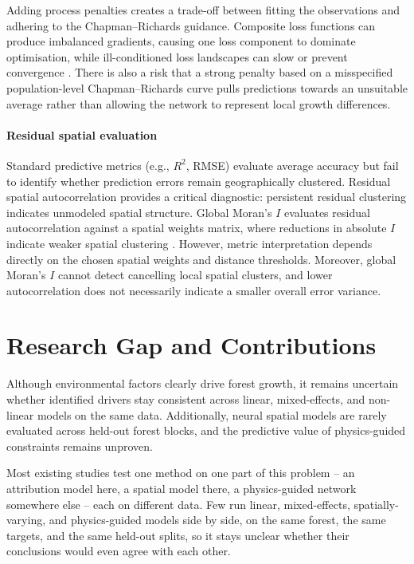 Adding process penalties creates a trade-off between fitting the observations and adhering to the Chapman--Richards guidance. Composite loss functions can produce imbalanced gradients, causing one loss component to dominate optimisation, while ill-conditioned loss landscapes can slow or prevent convergence \cite{wang2021Understanding_C4_NN}. %
There is also a risk that a strong penalty based on a misspecified population-level Chapman--Richards curve pulls predictions towards an unsuitable average rather than allowing the network to represent local growth differences.

\paragraph*{Residual spatial evaluation}
Standard predictive metrics (e.g., $R^2$, RMSE) evaluate average accuracy but fail to identify whether prediction errors remain geographically clustered. Residual spatial autocorrelation provides a critical diagnostic: persistent residual clustering indicates unmodeled spatial structure. Global Moran's $I$ evaluates residual autocorrelation against a spatial weights matrix, where reductions in absolute $I$ indicate weaker spatial clustering \cite{moran1950Notes_c5_eval, kim2021Predicting_C5_EVAL}. However, metric interpretation depends directly on the chosen spatial weights and distance thresholds. Moreover, global Moran's $I$ cannot detect cancelling local spatial clusters, and lower autocorrelation does not necessarily indicate a smaller overall error variance.

\section{Research Gap and Contributions}
Although environmental factors clearly drive forest growth, it remains uncertain whether identified drivers stay consistent across linear, mixed-effects, and non-linear models on the same data. Additionally, neural spatial models are rarely evaluated across held-out forest blocks, and the predictive value of physics-guided constraints remains unproven.

Most existing studies test one method on one part of this problem -- an attribution model here, a spatial model there, a physics-guided network somewhere else -- each on different data. Few run linear, mixed-effects, spatially-varying, and physics-guided models side by side, on the same forest, the same targets, and the same held-out splits, so it stays unclear whether their conclusions would even agree with each other.

